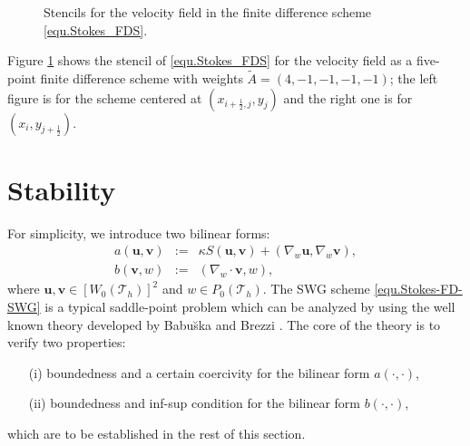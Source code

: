 \documentclass[final,leqno]{siamltex704}
\def\T{{\mathcal T}}
\begin{document}
\begin{figure}[!h]
\begin{center}
{
}
\end{center}
\caption{\label{Fig.DF.stencil2}Stencils for the velocity field in the finite difference scheme \eqref{equ.Stokes_FDS}.}
\end{figure}

Figure \ref{Fig.DF.stencil2} shows the stencil of  \eqref{equ.Stokes_FDS} for the velocity field as a five-point finite difference scheme with weights $\tilde A=(4,-1,-1,-1,-1)$; the left figure is for the scheme centered at $(x_{i+\frac12,j}, y_j)$ and the right one is for $(x_{i}, y_{j+\frac12})$.

\section{Stability}\label{Section:Stability}
For simplicity, we introduce two bilinear forms:
\begin{eqnarray}
a(\bm{u},\bm{v}) &:=& \kappa S(\bm{u},\bm{v}) + (\nabla_w \bm{u}, \nabla_w \bm{v}),\label{EQ:June30:001}\\
b(\bm{v},w) &:=& (\nabla_w \cdot \bm{v},w),\label{EQ:June30:002}
\end{eqnarray}
where $\bm{u}, \bm{v} \in [W_0(\T_h)]^2$ and $w \in {P}_0 (\T_h)$.
The SWG scheme \eqref{equ.Stokes-FD-SWG} is a typical saddle-point problem which can be analyzed by using the well known theory developed by Babu\u{s}ka \cite{Babuska1973} and Brezzi \cite{Brezzi1974}. The core of the theory is to verify two properties:
\begin{itemize}
\item[(i)] boundedness and a certain coercivity for the bilinear form $a(\cdot,\cdot)$,
\item[(ii)] boundedness and inf-sup condition for the bilinear form $b(\cdot,\cdot)$,
\end{itemize}
which are to be established in the rest of this section.
\end{document}
